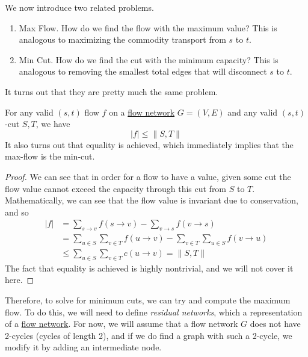   We now introduce two related problems. 
  \begin{enumerate}
    \item Max Flow. How do we find the flow with the maximum value? This is analogous to maximizing the commodity transport from $s$ to $t$.  
    \item Min Cut. How do we find the cut with the minimum capacity? This is analogous to removing the smallest total edges that will disconnect $s$ to $t$. 
  \end{enumerate} 

  It turns out that they are pretty much the same problem. 

  \begin{theorem}
    \label{thm:max-flow-min-cut-theorem}
    For any valid $(s, t)$ flow $f$ on a \hyperref[def:flow-network]{flow network} $G = (V, E)$ and any valid $(s, t)$-cut $S, T$, we have 
    \begin{equation}
      |f| \leq \|S, T\|
    \end{equation} 
    It also turns out that equality is achieved, which immediately implies that the max-flow is the min-cut. 
  \end{theorem}
  \begin{proof}
    We can see that in order for a flow to have a value, given some cut the flow value cannot exceed the capacity through this cut from $S$ to $T$. Mathematically, we can see that the flow value is invariant due to conservation, and so  
    \begin{align}
      |f| & = \sum_{s \rightarrow v} f(s \rightarrow v) - \sum_{v \rightarrow s} f(v \rightarrow s) \\ 
          & = \sum_{u \in S} \sum_{v \in T} f(u \rightarrow v) - \sum_{v \in T} \sum_{u \in S} f(v \rightarrow u) \\ 
          & \leq \sum_{u \in S} \sum_{v \in T} c(u \rightarrow v) = \|S, T\|
    \end{align}
    The fact that equality is achieved is highly nontrivial, and we will not cover it here. 
  \end{proof} 

  Therefore, to solve for minimum cuts, we can try and compute the maximum flow. To do this, we will need to define \textit{residual networks}, which a representation of a \hyperref[def:flow-network]{flow network}. For now, we will assume that a flow network $G$ does not have 2-cycles (cycles of length 2), and if we do find a graph with such a 2-cycle, we modify it by adding an intermediate node. 

